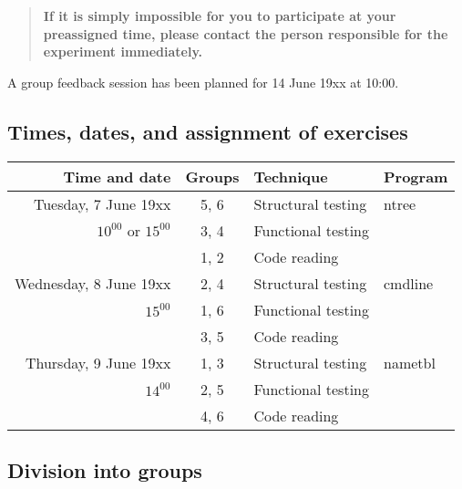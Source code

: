 \begin{quote}
\bf 
If it is simply impossible for you to participate at your preassigned
time, please contact the person responsible for the experiment
immediately.
\end{quote}

\bigskip

A group feedback session has been planned for 14 June 19xx at 10:00.

\bigskip



\newpage

\subsection*{Times, dates, and assignment of exercises}

\begin{center}
\begin{tabular}{|r|c|l|l|}
\hline
\bf Time and date         & \bf Groups  & \bf Technique        & \bf Program\\
\hline
Tuesday, 7 June 19xx      &  5, 6       &  Structural testing  &  ntree\\
$10^{00}$ or $15^{00}$    &  3, 4       &  Functional testing  & \\
                          &  1, 2       &  Code reading        & \\
\hline
Wednesday, 8 June 19xx    &  2, 4       &  Structural testing  & cmdline \\
$15^{00}$                 &  1, 6       &  Functional testing  & \\
                          &  3, 5       &  Code reading        & \\
\hline
Thursday, 9 June 19xx     &  1, 3       &  Structural testing  & nametbl \\
$14^{00}$                 &  2, 5       &  Functional testing  & \\
                          &  4, 6       &  Code reading        & \\
\hline
\end{tabular}
\end{center}


\subsection*{Division into groups}


